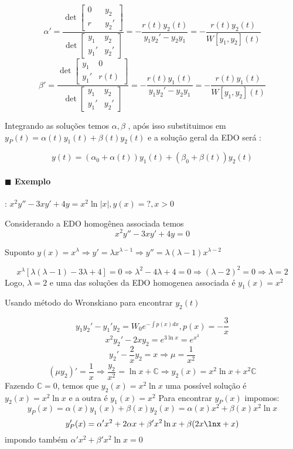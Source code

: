   \[  \alpha  ' = \frac{\det \begin{bmatrix} 0 && y_2 \\ r && y_2' \end{bmatrix}}
      {\det \begin{bmatrix} y_1 & y_2 \\ y_1 ' & y_2 ' \end{bmatrix}} = -
      \frac{r(t) y_2 (t) }{y_1 y_2' - y_2 y_1 } = - \frac{r(t) y_2(t) }{W[y_1, y_2](t)} \]
    \[ \beta  ' = \frac{\det \begin{bmatrix} y_1 & 0 \\ y_1 ' & r(t) \end{bmatrix} }
    {\det \begin{bmatrix} y_1 & y_2 \\ y_1 ' & y_2 ' \end{bmatrix}} = -
    \frac{r(t) y_1 (t) }{y_1 y_2' - y_2 y_1 } = - \frac{r(t) y_1(t) }{W[y_1, y_2](t)} \]

Integrando as soluções temos \( \alpha , \beta \) , após isso substituimos em \( y_P(t) = \alpha (t)
y_1(t) + \beta (t) y_2(t)\)  e a
solução geral da EDO será :

\[ y(t) = \left( \alpha _0 + \alpha (t) \right) y_1(t) + \left( \beta _0 + \beta (t) \right)y_2(t) \]

 \paragraph{$\blacksquare$ Exemplo}: \( x^2 y '' - 3x y' + 4y = x^2 \ln |x| , y(x) = ?, x> 0 \) 

 Considerando a EDO homogênea associada temos
 \[ x^2 y'' - 3xy' + 4y = 0  \]
 
 Suponto \( y(x) = x^{\lambda } \Rightarrow y' = \lambda x^{\lambda -1} \Rightarrow y'' = \lambda
 (\lambda - 1) x^{\lambda - 2}  \) 
 
 \[ x^{\lambda } \left[ \lambda (\lambda - 1) - 3 \lambda  + 4  \right] = 0 \Rightarrow \lambda
   ^2 - 4 \lambda  + 4 = 0 \Rightarrow \left( \lambda - 2 \right)^2 = 0 \Rightarrow \lambda  = 2 \]
 Logo, \( \lambda = 2 \) e uma das soluções da EDO homogenea associada é \( y_1 (x) = x^2 \) 


 Usando método do Wronskiano para encontrar \( y_2(t) \)

 \[ y_1 y_2 ' - y_1 ' y_2 = W_0 e^{- \int p(x) dx}, p(x) = - \frac{3}{x} \]
 \[ x^2 y_2 ' - 2x y_2 = e^{3 \ln x} = e^{x^3}  \]
 \[ y_2 ' - \frac{2}{x} y_2 = x \Rightarrow \mu = \frac{1}{x^2} \]
 \[ \left( \mu y_2 \right)' = \frac{1}{x} \Rightarrow \frac{y_2}{x^2} = \ln x + \mathbb{C}
   \Rightarrow y_2(x) = x^2 \ln x + x^2 \mathbb{C}\]
 Fazendo \( \mathbb{C} = 0 \), temos que \( y_2(x) = x^2 \ln x \) 
 uma possível solução é \( y_2(x) = x^2 \ln x \)   e a outra é \( y_1(x) = x^2 \) 
 Para encontrar \( y_P(x) \) impomos:
 \[ y_P(x) = \alpha (x) y_1(x) + \beta (x) y_2 (x) = \alpha (x) x^2 + \beta (x) x^2 \ln x\]
 \[ y_P'(x) =  \alpha ' x^2 + 2 \alpha  x + \beta ' x^2 \ln x + \beta (2x\lnx + x) \]
 impondo também \( \alpha ' x^2 + \beta ' x^2 \ln x = 0  \) 
 
